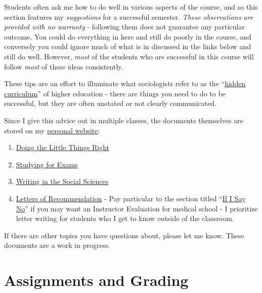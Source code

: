 \documentclass[]{book}
\providecommand{\tightlist}{%
  \setlength{\itemsep}{0pt}\setlength{\parskip}{0pt}}
\begin{document}
Students often ask me how to do well in various aspects of the course, and so this section features my \emph{suggestions} for a successful semester. \emph{These observations are provided with no warranty} - following them does not guarantee any particular outcome. You could do everything in here and still do poorly in the course, and conversely you could ignore much of what is in discussed in the links below and still do well. However, \emph{most} of the students who are successful in this course will follow \emph{most} of these ideas consistently.

These tips are an effort to illuminate what sociologists refer to as the ``\href{https://books.google.com/books?hl=en\&lr=\&id=5r-TAgAAQBAJ\&oi=fnd\&pg=PP1\&dq=hidden+curriculum\#v=onepage\&q=hidden\%20curriculum\&f=false}{hidden curriculum}'' of higher education - there are things you need to do to be successful, but they are often unstated or not clearly communicated.

Since I give this advice out in multiple classes, the documents themselves are stored on my \href{https://chris-prener.github.io}{personal website}:

\begin{enumerate}
\def\labelenumi{\arabic{enumi}.}
\tightlist
\item
  \href{https://chris-prener.github.io/resources/little-things/}{Doing the Little Things Right}
\item
  \href{https://chris-prener.github.io/resources/exams/}{Studying for Exams}
\item
  \href{https://chris-prener.github.io/resources/writing/}{Writing in the Social Sciences}
\item
  \href{https://chris-prener.github.io/resources/letters/}{Letters of Recommendation} - Pay particular to the section titled ``\href{https://chris-prener.github.io/resources/letters/\#if-i-say-no}{If I Say No}'' if you may want an Instructor Evaluation for medical school - I prioritize letter writing for students who I get to know outside of the classroom.
\end{enumerate}

If there are other topics you have questions about, please let me know. These documents are a work in progress.

\hypertarget{assignments-and-grading}{%
\chapter{Assignments and Grading}\label{assignments-and-grading}}
\end{document}
